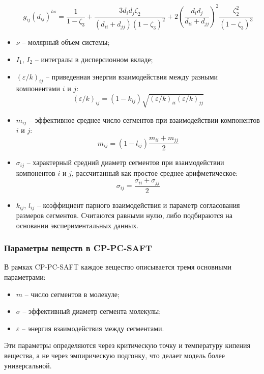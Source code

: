 \documentclass[a4paper,12pt]{article}
\begin{document}
\begin{itemize}
\begin{equation}
            g_{ij}(d_{ij})^{hs} = \frac{1}{1 - \zeta_3} + \frac{3d_{i}d_{j}\zeta_2}{(d_{ii} + d_{jj})(1 - \zeta_3)^2} + 2 \left( \frac{d_{i}d_{j}}{d_{ii} + d_{jj}} \right)^2 \frac{\zeta_2^2}{(1 - \zeta_3)^3}
          \end{equation}
        \item $\nu$ -- молярный объем системы;
        \item $I_1$, $I_2$ -- интегралы в дисперсионном вкладе;
        \item $(\varepsilon / k)_{ij}$ -- приведенная энергия взаимодействия между разными компонентами $i$ и $j$:
          \begin{equation}
              (\varepsilon / k)_{ij} = (1 - k_{ij}) \sqrt{(\varepsilon / k)_{ii} (\varepsilon / k)_{jj}}
          \end{equation}
        \item $m_{ij}$ -- эффективное среднее число сегментов при взаимодействии компонентов $i$ и $j$:
          \[
            m_{ij} = \left(1 - l_{ij}\right) \frac{m_{ii} + m_{jj}}{2}
          \]
        \item $\sigma_{ij}$ -- характерный средний диаметр сегментов при взаимодействии компонентов $i$ и $j$, рассчитанный как простое среднее арифметическое:
          \[
            \sigma_{ij} = \frac{\sigma_{ii} + \sigma_{jj}}{2}
          \]
        \item $k_{ij}$, $l_{ij}$ -- коэффициент парного взаимодействия и параметр согласования размеров сегментов. Считаются равными нулю, либо подбираются на основании экспериментальных данных.
    
    \end{itemize}
    
    \subsubsection{Параметры веществ  в CP-PC-SAFT}

В рамках CP-PC-SAFT каждое вещество описывается тремя основными параметрами:
\begin{itemize}
    \item \( m \) -- число сегментов в молекуле;
    \item \( \sigma \) -- эффективный диаметр сегмента молекулы;
    \item \( \varepsilon \) -- энергия взаимодействия между сегментами.
\end{itemize}

Эти параметры определяются через критическую точку и температуру кипения вещества, а не через эмпирическую подгонку, что делает модель более универсальной.
\end{document}

